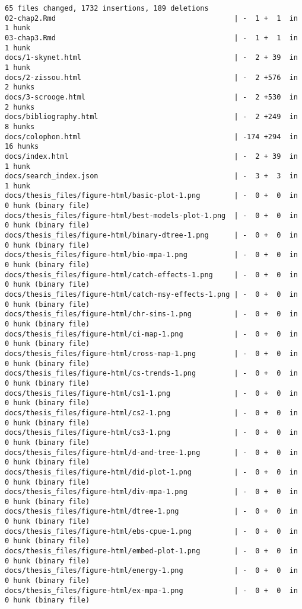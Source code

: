 \documentclass[twoside,12pt,final]{ucthesis-CA2012}
\begin{document}
\begin{ucmainmatter}
\begin{verbatim}
65 files changed, 1732 insertions, 189 deletions
02-chap2.Rmd                                          | -  1 +  1  in  1 hunk
03-chap3.Rmd                                          | -  1 +  1  in  1 hunk
docs/1-skynet.html                                    | -  2 + 39  in  1 hunk
docs/2-zissou.html                                    | -  2 +576  in  2 hunks
docs/3-scrooge.html                                   | -  2 +530  in  2 hunks
docs/bibliography.html                                | -  2 +249  in  8 hunks
docs/colophon.html                                    | -174 +294  in 16 hunks
docs/index.html                                       | -  2 + 39  in  1 hunk
docs/search_index.json                                | -  3 +  3  in  1 hunk
docs/thesis_files/figure-html/basic-plot-1.png        | -  0 +  0  in  0 hunk (binary file)
docs/thesis_files/figure-html/best-models-plot-1.png  | -  0 +  0  in  0 hunk (binary file)
docs/thesis_files/figure-html/binary-dtree-1.png      | -  0 +  0  in  0 hunk (binary file)
docs/thesis_files/figure-html/bio-mpa-1.png           | -  0 +  0  in  0 hunk (binary file)
docs/thesis_files/figure-html/catch-effects-1.png     | -  0 +  0  in  0 hunk (binary file)
docs/thesis_files/figure-html/catch-msy-effects-1.png | -  0 +  0  in  0 hunk (binary file)
docs/thesis_files/figure-html/chr-sims-1.png          | -  0 +  0  in  0 hunk (binary file)
docs/thesis_files/figure-html/ci-map-1.png            | -  0 +  0  in  0 hunk (binary file)
docs/thesis_files/figure-html/cross-map-1.png         | -  0 +  0  in  0 hunk (binary file)
docs/thesis_files/figure-html/cs-trends-1.png         | -  0 +  0  in  0 hunk (binary file)
docs/thesis_files/figure-html/cs1-1.png               | -  0 +  0  in  0 hunk (binary file)
docs/thesis_files/figure-html/cs2-1.png               | -  0 +  0  in  0 hunk (binary file)
docs/thesis_files/figure-html/cs3-1.png               | -  0 +  0  in  0 hunk (binary file)
docs/thesis_files/figure-html/d-and-tree-1.png        | -  0 +  0  in  0 hunk (binary file)
docs/thesis_files/figure-html/did-plot-1.png          | -  0 +  0  in  0 hunk (binary file)
docs/thesis_files/figure-html/div-mpa-1.png           | -  0 +  0  in  0 hunk (binary file)
docs/thesis_files/figure-html/dtree-1.png             | -  0 +  0  in  0 hunk (binary file)
docs/thesis_files/figure-html/ebs-cpue-1.png          | -  0 +  0  in  0 hunk (binary file)
docs/thesis_files/figure-html/embed-plot-1.png        | -  0 +  0  in  0 hunk (binary file)
docs/thesis_files/figure-html/energy-1.png            | -  0 +  0  in  0 hunk (binary file)
docs/thesis_files/figure-html/ex-mpa-1.png            | -  0 +  0  in  0 hunk (binary file)

\end{verbatim}
\end{ucmainmatter}
\end{document}
